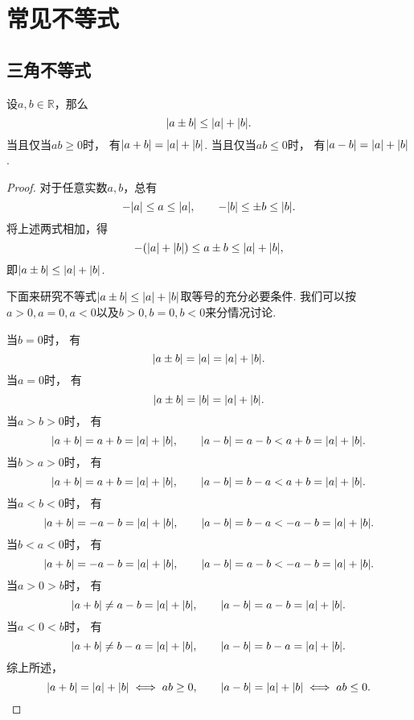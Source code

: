 \section{常见不等式}
\subsection{三角不等式}
\begin{theorem}[三角不等式I]\label{theorem:不等式.三角不等式1}
设\(a,b\in\mathbb{R}\)，那么\begin{equation}
	\abs{a \pm b}
	\leq
	\abs{a} + \abs{b}.
\end{equation}
当且仅当\(ab\geq0\)时，
有\(\abs{a+b}=\abs{a}+\abs{b}\).
当且仅当\(ab\leq0\)时，
有\(\abs{a-b}=\abs{a}+\abs{b}\).
\begin{proof}
对于任意实数\(a,b\)，总有\[
	-\abs{a} \leq a \leq \abs{a}, \qquad
	-\abs{b} \leq \pm b \leq \abs{b}.
\]
将上述两式相加，得\[
	-(\abs{a}+\abs{b}) \leq a \pm b \leq \abs{a}+\abs{b},
\]
即\(\abs{a \pm b} \leq \abs{a}+\abs{b}\).

下面来研究不等式\(\abs{a \pm b} \leq \abs{a} + \abs{b}\)取等号的充分必要条件.
我们可以按\(a>0,a=0,a<0\)以及\(b>0,b=0,b<0\)来分情况讨论.

当\(b=0\)时，
有\[
	\abs{a \pm b} = \abs{a} = \abs{a} + \abs{b}.
\]
当\(a=0\)时，
有\[
	\abs{a \pm b} = \abs{b} = \abs{a} + \abs{b}.
\]
当\(a>b>0\)时，
有\[
	\abs{a + b} = a + b = \abs{a} + \abs{b}, \qquad
	\abs{a - b} = a - b < a + b = \abs{a} + \abs{b}.
\]
当\(b>a>0\)时，
有\[
	\abs{a + b} = a + b = \abs{a} + \abs{b}, \qquad
	\abs{a - b} = b - a < a + b = \abs{a} + \abs{b}.
\]
当\(a<b<0\)时，
有\[
	\abs{a + b} = -a-b = \abs{a} + \abs{b}, \qquad
	\abs{a - b} = b-a < -a-b = \abs{a} + \abs{b}.
\]
当\(b<a<0\)时，
有\[
	\abs{a + b} = -a-b = \abs{a} + \abs{b}, \qquad
	\abs{a - b} = a-b < -a-b = \abs{a} + \abs{b}.
\]
当\(a>0>b\)时，
有\[
	\abs{a + b} \neq a - b = \abs{a} + \abs{b}, \qquad
	\abs{a - b} = a - b = \abs{a} + \abs{b}.
\]
当\(a<0<b\)时，
有\[
	\abs{a + b} \neq b - a = \abs{a} + \abs{b}, \qquad
	\abs{a - b} = b - a = \abs{a} + \abs{b}.
\]
综上所述，\[
	\abs{a + b} = \abs{a} + \abs{b} \iff ab \geq 0, \qquad
	\abs{a - b} = \abs{a} + \abs{b} \iff ab \leq 0.
	\qedhere
\]
\end{proof}
\end{theorem}

